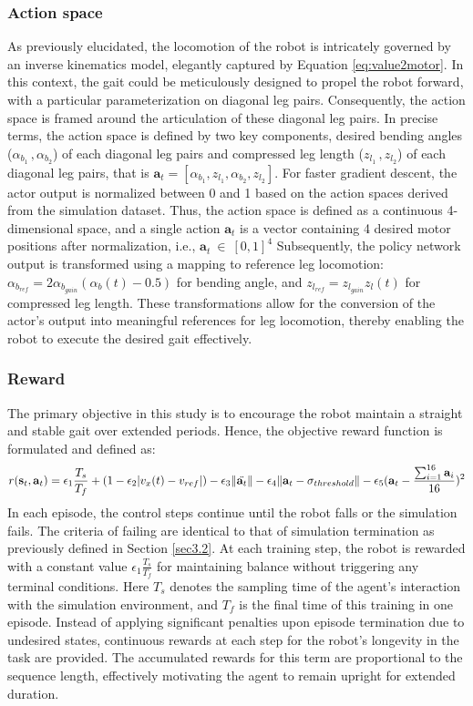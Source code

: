 \subsubsection{Action space}
\label{Sec:as}
As previously elucidated, the locomotion of the robot is intricately governed by an inverse kinematics model, elegantly captured by Equation \ref{eq:value2motor}. In this context, the gait could be meticulously designed to propel the robot forward, with a particular parameterization on diagonal leg pairs. Consequently, the action space is framed around the articulation of these diagonal leg pairs. In precise terms, the action space is defined by two key components, desired bending angles ($\alpha_{b_1}\,,\alpha_{b_2}$) of each diagonal leg pairs and compressed leg length ($z_{l_1}\,,z_{l_2}$) of each diagonal leg pairs, that is $\mathbf{a}_{t} = [\alpha_{b_1}, z_{l_1}, \alpha_{b_2}, z_{l_2}]$. For faster gradient descent, the actor output is normalized between 0 and 1 based on the action spaces derived from the simulation dataset. Thus, the action space is defined as a continuous 4-dimensional space, and a single action $\mathbf{a}_t$ is a vector containing 4 desired motor positions after normalization, i.e., $\mathbf{a}_t \:\in\:[0,1]^4$ Subsequently, the policy network output is transformed using a mapping to reference leg locomotion: $\alpha_{b_{ref}} = 2\alpha_{b_{gain}}(\alpha_b(t) -0.5)$ for bending angle, and $z_{l_{ref}} = z_{l_{gain}}z_l(t)$ for compressed leg length. These transformations allow for the conversion of the actor's output into meaningful references for leg locomotion, thereby enabling the robot to execute the desired gait effectively.
\subsubsection{Reward}
The primary objective in this study is to encourage the robot maintain a straight and stable gait over extended periods. Hence, the objective reward function is formulated and defined as: 
\begin{equation}
    r(\mathbf{s}_t,\mathbf{a}_t) = \epsilon_1\frac{T_s}{T_f} + (1-\epsilon_2|v_x(t)-v_{ref}|)-\epsilon_3\lVert\Ddot{\mathbf{a}_t}\rVert - \epsilon_4\lVert\mathbf{a}_t-\mathbf{\sigma}_{threshold}\rVert - \epsilon_5(\mathbf{a}_t-\frac{\sum_{i=1}^{16}\mathbf{a}_i}{16})^2
    \label{eq:reward}
\end{equation}
In each episode, the control steps continue until the robot falls or the simulation fails. The criteria of failing are identical to that of simulation termination as previously defined in Section \ref{sec3.2}. At each training step, the robot is rewarded with a constant value $\epsilon_1\frac{T_s}{T_f}$ for maintaining balance without triggering any terminal conditions. Here $T_s$ denotes the sampling time of the agent's interaction with the simulation environment, and $T_f$ is the final time of this training in one episode. Instead of applying significant penalties upon episode termination due to undesired states, continuous rewards at each step for the robot's longevity in the task are provided. The accumulated rewards for this term are proportional to the sequence length, effectively motivating the agent to remain upright for extended duration. 


